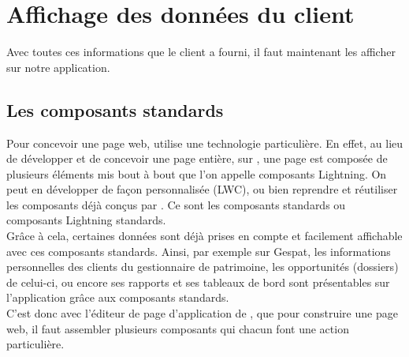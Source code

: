 \documentclass[12pt,oneside,noprintercorrection]{iut}
\begin{document}
\section{Affichage des données du client}
Avec toutes ces informations que le client a fourni, il faut maintenant les afficher sur notre application.

\subsection{Les composants standards}
Pour concevoir une page web, \slf{} utilise une technologie particulière. En effet, au lieu de développer et de concevoir une page entière, sur \slf{}, une page est composée de plusieurs éléments mis bout à bout que l'on appelle composants Lightning. On peut en développer de façon personnalisée (LWC), ou bien reprendre et réutiliser les composants déjà conçus par \slf{}. Ce sont les composants standards ou composants Lightning standards. 
~\\\indent Grâce à cela, certaines données sont déjà prises en compte et facilement affichable avec ces composants standards. Ainsi, par exemple sur Gespat, les informations personnelles des clients du gestionnaire de patrimoine, les opportunités (dossiers) de celui-ci, ou encore ses rapports et ses tableaux de bord sont présentables sur l'application grâce aux composants standards.
~\\\indent  C'est donc avec l'éditeur de page d'application de \slf{}, que pour construire une page web, il faut assembler plusieurs composants qui chacun font une action particulière.
\newpage
\end{document}
